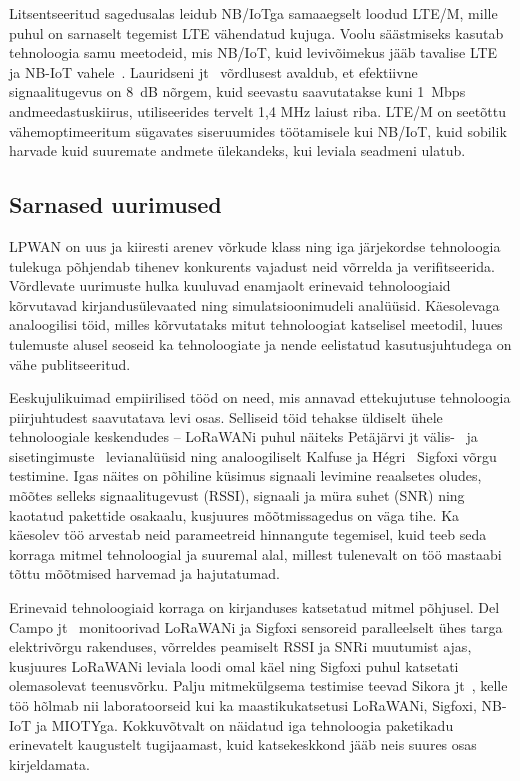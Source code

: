\documentclass[12pt]{article}
\newcommand{\TODO}{\todo[inline]}
\begin{document}
    Litsentseeritud sagedusalas leidub NB\-/IoTga samaaegselt loodud LTE\-/M, mille puhul on sarnaselt tegemist LTE vähendatud kujuga.
    Voolu säästmiseks kasutab tehnoloogia samu meetodeid, mis NB\-/IoT, kuid levivõimekus jääb tavalise LTE ja NB-IoT vahele~\cite{benhiba2018comparative}.
    Lauridseni jt~\cite{lauridsen2016coverage} võrdlusest avaldub, et efektiivne signaalitugevus on 8~dB nõrgem, kuid seevastu saavutatakse kuni 1~Mbps andmeedastuskiirus, utiliseerides tervelt 1,4 MHz laiust riba.
    LTE\-/M on seetõttu vähemoptimeeritum sügavates siseruumides töötamisele kui NB\-/IoT, kuid sobilik harvade kuid suuremate andmete ülekandeks, kui leviala seadmeni ulatub.

    \TODO{Litsentseerimata sagedusalas\ldots}

    \subsection{Sarnased uurimused}
    LPWAN on uus ja kiiresti arenev võrkude klass ning iga järjekordse tehnoloogia tulekuga põhjendab tihenev konkurents vajadust neid võrrelda ja verifitseerida.
    Võrdlevate uurimuste hulka kuuluvad enamjaolt erinevaid tehnoloogiaid kõrvutavad kirjandusülevaated ning simulatsioonimudeli analüüsid.
    Käesolevaga analoogilisi töid, milles kõrvutataks mitut tehnoloogiat katselisel meetodil, luues tulemuste alusel seoseid ka tehnoloogiate ja nende eelistatud kasutusjuhtudega on vähe publitseeritud.

    Eeskujulikuimad empiirilised tööd on need, mis annavad ettekujutuse tehnoloogia piirjuhtudest saavutatava levi osas.
    Selliseid töid tehakse üldiselt ühele tehnoloogiale keskendudes -- LoRaWANi puhul näiteks Petäjärvi jt välis-~\cite{petajajarvi2015coverage} ja sisetingimuste~\cite{petajajarvi} levianalüüsid ning analoogiliselt Kalfuse ja Hégri~\cite{kalfus2016ultra} Sigfoxi võrgu testimine.
    Igas näites on põhiline küsimus signaali levimine reaalsetes oludes, mõõtes selleks signaalitugevust (RSSI), signaali ja müra suhet (SNR) ning kaotatud pakettide osakaalu, kusjuures mõõtmissagedus on väga tihe.
    Ka käesolev töö arvestab neid parameetreid hinnangute tegemisel, kuid teeb seda korraga mitmel tehnoloogial ja suuremal alal, millest tulenevalt on töö mastaabi tõttu mõõtmised harvemad ja hajutatumad.

    Erinevaid tehnoloogiaid korraga on kirjanduses katsetatud mitmel põhjusel.
    Del Campo jt~\cite{del2019hybrid} monitoorivad LoRaWANi ja Sigfoxi sensoreid paralleelselt ühes targa elektrivõrgu rakenduses, võrreldes peamiselt RSSI ja SNRi muutumist ajas, kusjuures LoRaWANi leviala loodi omal käel ning Sigfoxi puhul katsetati olemasolevat teenusvõrku.
    Palju mitmekülgsema testimise teevad Sikora jt~\cite{sikora2019test}, kelle töö hõlmab nii laboratoorseid kui ka maastikukatsetusi LoRaWANi, Sigfoxi, NB-IoT ja MIOTYga.
    Kokkuvõtvalt on näidatud iga tehnoloogia paketikadu erinevatelt kaugustelt tugijaamast, kuid katsekeskkond jääb neis suures osas kirjeldamata.
\end{document}
